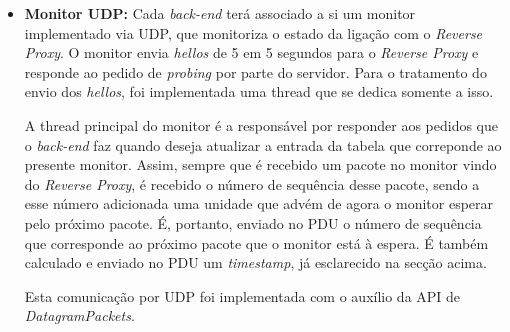 \documentclass{llncs}
\begin{document}
\begin{itemize}
	\setlength\itemsep{1em}
	\setlength{\parindent}{1cm}
\item \textbf{Monitor UDP:} Cada \textit{back-end} terá associado a si um monitor implementado via UDP, que monitoriza o estado da ligação com o \textit{Reverse Proxy}. O monitor envia \textit{hellos} de 5 em 5 segundos para o \textit{Reverse Proxy} e responde ao pedido de \textit{probing} por parte do servidor. Para o tratamento do envio dos \textit{hellos}, foi implementada uma thread que se dedica somente a isso.\par
	A thread principal do monitor é a responsável por responder aos pedidos que o \textit{back-end} faz quando deseja atualizar a entrada da tabela que correponde ao presente monitor. Assim, sempre que é recebido um pacote no monitor vindo do \textit{Reverse Proxy}, é recebido o número de sequência desse pacote, sendo a esse número adicionada uma unidade que advém de agora o monitor esperar pelo próximo pacote. É, portanto, enviado no PDU o número de sequência que corresponde ao próximo pacote que o monitor está à espera. É também calculado e enviado no PDU um \textit{timestamp}, já esclarecido na secção acima.\par
	Esta comunicação por UDP foi implementada com o auxílio da API de \textit{DatagramPackets}.
	

\end{itemize}
\end{document}

